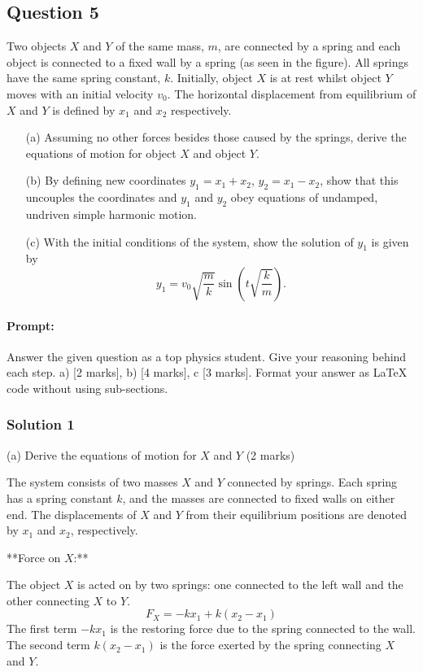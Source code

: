 \documentclass{article}
\begin{document}
\subsection{Question 5}

Two objects $X$ and $Y$ of the same mass, $m$, are connected by a spring and each object is connected to a fixed wall by a spring (as seen in the figure). All springs have the same spring constant, $k$. Initially, object $X$ is at rest whilst object $Y$ moves with an initial velocity $v_0$. The horizontal displacement from equilibrium of $X$ and $Y$ is defined by $x_1$ and $x_2$ respectively.

\begin{enumerate}
    \item[(a)] Assuming no other forces besides those caused by the springs, derive the equations of motion for object $X$ and object $Y$.
    \item[(b)] By defining new coordinates $y_1 = x_1 + x_2$, $y_2 = x_1 - x_2$, show that this uncouples the coordinates and $y_1$ and $y_2$ obey equations of undamped, undriven simple harmonic motion.
    \item[(c)] With the initial conditions of the system, show the solution of $y_1$ is given by
    \[
    y_1 = v_0 \sqrt{\frac{m}{k}} \sin\left(t \sqrt{\frac{k}{m}}\right).
    \]
\end{enumerate}

\paragraph{Prompt: \\} 
Answer the given question as a top physics student. Give your reasoning behind each step. a) [2 marks], b) [4 marks], c [3 marks].
Format your answer as LaTeX code without using sub-sections.

\subsubsection{Solution 1}
(a) Derive the equations of motion for $X$ and $Y$ (2 marks)

The system consists of two masses $X$ and $Y$ connected by springs. Each spring has a spring constant $k$, and the masses are connected to fixed walls on either end. The displacements of $X$ and $Y$ from their equilibrium positions are denoted by $x_1$ and $x_2$, respectively.

**Force on $X$:**

The object $X$ is acted on by two springs: one connected to the left wall and the other connecting $X$ to $Y$.
\[
F_X = -k x_1 + k (x_2 - x_1)
\]
The first term $-k x_1$ is the restoring force due to the spring connected to the wall. The second term $k (x_2 - x_1)$ is the force exerted by the spring connecting $X$ and $Y$.
\end{document}
